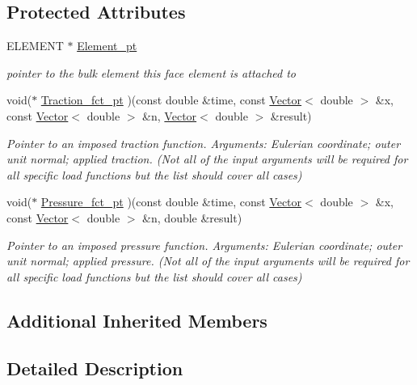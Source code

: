 \subsection*{Protected Attributes}
\begin{DoxyCompactItemize}
\item 
E\+L\+E\+M\+E\+NT $\ast$ \hyperlink{classoomph_1_1PoroelasticityFaceElement_abc3e4d3ab29b19432676b25962b7994d}{Element\+\_\+pt}
\begin{DoxyCompactList}\small\item\em pointer to the bulk element this face element is attached to \end{DoxyCompactList}\item 
void($\ast$ \hyperlink{classoomph_1_1PoroelasticityFaceElement_a5b6babb5cb6ced6a3928617730eafb83}{Traction\+\_\+fct\+\_\+pt} )(const double \&time, const \hyperlink{classoomph_1_1Vector}{Vector}$<$ double $>$ \&x, const \hyperlink{classoomph_1_1Vector}{Vector}$<$ double $>$ \&n, \hyperlink{classoomph_1_1Vector}{Vector}$<$ double $>$ \&result)
\begin{DoxyCompactList}\small\item\em Pointer to an imposed traction function. Arguments\+: Eulerian coordinate; outer unit normal; applied traction. (Not all of the input arguments will be required for all specific load functions but the list should cover all cases) \end{DoxyCompactList}\item 
void($\ast$ \hyperlink{classoomph_1_1PoroelasticityFaceElement_afbc70ad45cf51317cee1134237daf962}{Pressure\+\_\+fct\+\_\+pt} )(const double \&time, const \hyperlink{classoomph_1_1Vector}{Vector}$<$ double $>$ \&x, const \hyperlink{classoomph_1_1Vector}{Vector}$<$ double $>$ \&n, double \&result)
\begin{DoxyCompactList}\small\item\em Pointer to an imposed pressure function. Arguments\+: Eulerian coordinate; outer unit normal; applied pressure. (Not all of the input arguments will be required for all specific load functions but the list should cover all cases) \end{DoxyCompactList}\end{DoxyCompactItemize}
\subsection*{Additional Inherited Members}


\subsection{Detailed Description}
